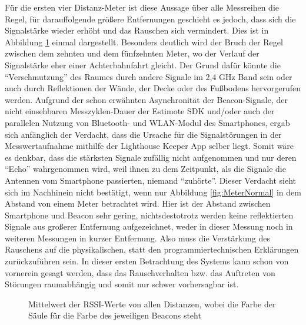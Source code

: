 Für die ersten vier Distanz-Meter ist diese Aussage über alle Messreihen die Regel, für darauffolgende größere Entfernungen geschieht es jedoch, dass sich die Signalstärke wieder erhöht und das Rauschen sich vermindert. Dies ist in Abbildung  \ref{fig:MittelwertAlle} einmal dargestellt. Besonders deutlich wird der Bruch der Regel zwischen dem zehnten und dem fünfzehnten Meter, wo der Verlauf der Signalstärke eher einer Achterbahnfahrt gleicht. Der Grund dafür könnte die "`Verschmutzung"' des Raumes durch andere Signale im 2,4 GHz Band sein oder auch durch Reflektionen der Wände, der Decke oder des Fußbodens hervorgerufen werden. Aufgrund der schon erwähnten Asynchronität der Beacon-Signale, der nicht einsehbaren Messzyklen-Dauer der Estimote SDK und/oder auch der parallelen Nutzung von Bluetooth- und WLAN-Modul des Smartphones, ergab sich anfänglich der Verdacht, dass die Ursache für die Signalstörungen in der Messwertaufnahme mithilfe der Lighthouse Keeper App selber liegt. Somit wäre es denkbar, dass die stärksten Signale zufällig nicht aufgenommen und nur deren "`Echo"' wahrgenommen wird, weil ihnen zu dem Zeitpunkt, als die Signale die Antennen vom Smartphone passierten, niemand "`zuhörte"'. Dieser Verdacht sieht sich im Nachhinein nicht bestätigt, wenn nur Abbildung \ref{fig:MeterNormal} in dem Abstand von einem Meter betrachtet wird. Hier ist der Abstand zwischen Smartphone und Beacon sehr gering, nichtsdestotrotz werden keine reflektierten Signale aus großerer Entfernung aufgezeichnet, weder in dieser Messung noch in weiteren Messungen in kurzer Entfernung. Also muss die Verstärkung des Rauschens auf die physikalischen, statt den programmiertechnischen Erklärungen zurückzuführen sein. In dieser ersten Betrachtung des Systems kann schon von vornerein gesagt werden, dass das Rauschverhalten bzw. das Auftreten von Störungen raumabhängig und somit nur schwer vorhersagbar ist.
\begin{figure}[H] 
\centering
{}
\caption{Mittelwert der RSSI-Werte von allen Distanzen, wobei die Farbe der Säule für die Farbe des jeweiligen Beacons steht}
\label{fig:MittelwertAlle}
\end{figure}

